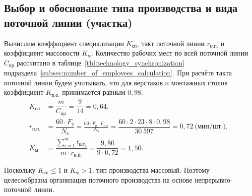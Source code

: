 \subsection{Выбор и обоснование типа производства и вида поточной линии (участка)}
\label{subsec:choice}

Вычислим коэффициент специализации $ K_{\text{сп}} $, такт поточной линии $r_{\text{н.п.}}$
и коэффициент массовости $ K_\text{м} $. Количество рабочих мест по всей поточной
линии $C_{\text{пр}}$ рассчитано в таблице~\ref{tbl:technology_synchronization}
подраздела~\ref{subsec:number_of_employees_calculation}. При расчёте такта поточной
линии будем учитывать, что для верстаков и монтажных столов коэффициент
$ K_\text{п.о.} $ принимается равным $0{,}98$.
\begin{align*}
K_{\text{сп}} &= \dfrac{m}{C_{\text{пр}}} = \dfrac{9}{14} = 0{,}64, \\
r_{\text{н.п.}} &= \dfrac{60 \cdot F_{\text{э}}}{N_{\text{з}}} =
  \frac{60 \cdot F_{\text{н}} \cdot F_{\text{п.о}}}{N_{\text{з}}} =
  \dfrac{60 \cdot 2 \cdot 23 \cdot 8 \cdot 0{,}98}{30~597} =
 0{,}72~\text{(мин/шт.)}, \\
K_{\text{м}} &=
\dfrac{\sum\limits^m_{i=1} t_{\text{шт}_{i}}}{m \cdot r_{\text{н.п.}}} =
\dfrac{9{,}80}{9 \cdot 0{,}72} = 1{,}50.
\end{align*}

Поскольку $ K_{\text{сп}} \le 1 $ и $ K_{\text{м}} > 1 $, тип производства
массовый. Поэтому целесообразна организация поточного
производства на основе непрерывно-поточной линии.
